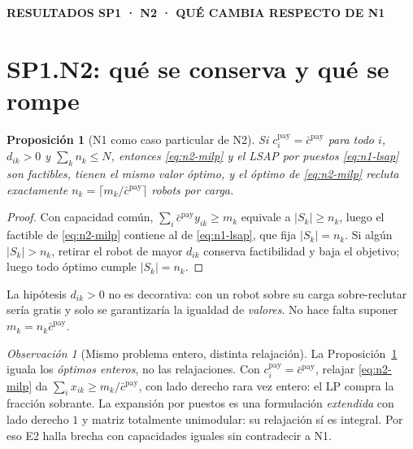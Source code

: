 \documentclass[12pt,a4paper]{article}
\newcommand{\leveltag}[1]{%
  \noindent\colorbox{VIUDark}{%
    \parbox{\dimexpr\textwidth-2\fboxsep\relax}{%
      \color{white}\sffamily\bfseries\small #1%
    }%
  }\par\smallskip
}
\newtheorem{n1prop}{Proposición}
\begin{document}
\clearpage

\theoremstyle{remark}
\newtheorem{n1obs}{Observación}

\theoremstyle{plain}

\leveltag{RESULTADOS SP1 · N2 · QUÉ CAMBIA RESPECTO DE N1}
\section*{SP1.N2: qué se conserva y qué se rompe}

\begin{n1prop}[N1 como caso particular de N2]
\label{prop:n2-limit}
Si $c_i^{\mathrm{pay}}=\bar c^{\mathrm{pay}}$ para todo $i$, $d_{ik}>0$ y
$\sum_kn_k\leq N$, entonces \eqref{eq:n2-milp} y el LSAP por puestos
\eqref{eq:n1-lsap} son factibles, tienen el mismo valor óptimo, y el óptimo de
\eqref{eq:n2-milp} recluta exactamente
$n_k=\lceil m_k/\bar c^{\mathrm{pay}}\rceil$ robots por carga.
\end{n1prop}

{\small
\begin{proof}
Con capacidad común, $\sum_i\bar c^{\mathrm{pay}}y_{ik}\geq m_k$ equivale a
$|S_k|\geq n_k$, luego el factible de \eqref{eq:n2-milp} contiene al de
\eqref{eq:n1-lsap}, que fija $|S_k|=n_k$. Si algún $|S_k|>n_k$, retirar el robot
de mayor $d_{ik}$ conserva factibilidad y baja el objetivo; luego todo óptimo
cumple $|S_k|=n_k$.
\end{proof}
}

La hipótesis $d_{ik}>0$ no es decorativa: con un robot sobre su carga
sobre-reclutar sería gratis y solo se garantizaría la igualdad de
\emph{valores}. No hace falta suponer $m_k=n_k\bar c^{\mathrm{pay}}$.

\begin{n1obs}[Mismo problema entero, distinta relajación]
\label{obs:n2-relaxation}
La Proposición~\ref{prop:n2-limit} iguala los \emph{óptimos enteros}, no las
relajaciones. Con $c_i^{\mathrm{pay}}=\bar c^{\mathrm{pay}}$, relajar
\eqref{eq:n2-milp} da $\sum_ix_{ik}\geq m_k/\bar c^{\mathrm{pay}}$, con lado
derecho rara vez entero: el LP compra la fracción sobrante. La expansión por
puestos es una formulación \emph{extendida} con lado derecho $1$ y matriz
totalmente unimodular: su relajación sí es integral. Por eso E2 halla
brecha con capacidades iguales sin contradecir a N1.
\end{n1obs}
\end{document}
